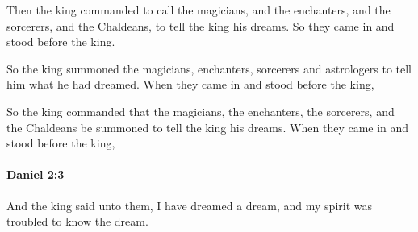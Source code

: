 			\begin{versebox}
					\item[BHS] 
					\item[LXX] 
					\item[ASV] Then the king commanded to call the magicians, and the enchanters, and the sorcerers, and the Chaldeans, to tell the king his dreams. So they came in and stood before the king.
					\item[NIV] So the king summoned the magicians, enchanters, sorcerers and astrologers to tell him what he had dreamed. When they came in and stood before the king,
					\item[NRSV] So the king commanded that the magicians, the enchanters, the sorcerers, and the Chaldeans be summoned to tell the king his dreams. When they came in and stood before the king,
			\end{versebox}

		\paragraph{Daniel 2:3} %
			\label{DANIEL-2-3}

			And the king said unto them, I have dreamed a dream, and my spirit was troubled to know the dream.

